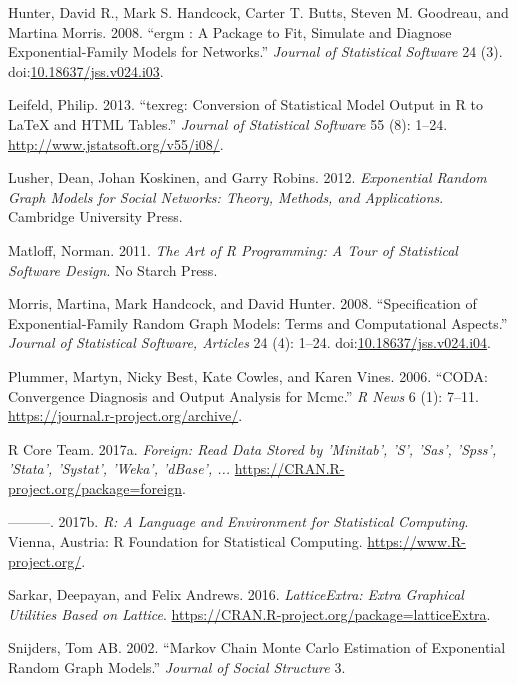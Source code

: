 \documentclass[]{book}
\theoremstyle{definition}
\theoremstyle{definition}
\theoremstyle{definition}
\theoremstyle{remark}
\begin{document}
\hypertarget{ref-Hunter2008}{}
Hunter, David R., Mark S. Handcock, Carter T. Butts, Steven M. Goodreau,
and Martina Morris. 2008. ``ergm : A Package to Fit, Simulate and
Diagnose Exponential-Family Models for Networks.'' \emph{Journal of
Statistical Software} 24 (3).
doi:\href{https://doi.org/10.18637/jss.v024.i03}{10.18637/jss.v024.i03}.

\hypertarget{ref-R-texreg}{}
Leifeld, Philip. 2013. ``texreg: Conversion of Statistical Model Output
in R to LaTeX and HTML Tables.'' \emph{Journal of Statistical Software}
55 (8): 1--24. \url{http://www.jstatsoft.org/v55/i08/}.

\hypertarget{ref-lusher2012}{}
Lusher, Dean, Johan Koskinen, and Garry Robins. 2012. \emph{Exponential
Random Graph Models for Social Networks: Theory, Methods, and
Applications}. Cambridge University Press.

\hypertarget{ref-Matloff2011}{}
Matloff, Norman. 2011. \emph{The Art of R Programming: A Tour of
Statistical Software Design}. No Starch Press.

\hypertarget{ref-Morris2008}{}
Morris, Martina, Mark Handcock, and David Hunter. 2008. ``Specification
of Exponential-Family Random Graph Models: Terms and Computational
Aspects.'' \emph{Journal of Statistical Software, Articles} 24 (4):
1--24.
doi:\href{https://doi.org/10.18637/jss.v024.i04}{10.18637/jss.v024.i04}.

\hypertarget{ref-R-coda}{}
Plummer, Martyn, Nicky Best, Kate Cowles, and Karen Vines. 2006. ``CODA:
Convergence Diagnosis and Output Analysis for Mcmc.'' \emph{R News} 6
(1): 7--11. \url{https://journal.r-project.org/archive/}.

\hypertarget{ref-R-foreign}{}
R Core Team. 2017a. \emph{Foreign: Read Data Stored by 'Minitab', 'S',
'Sas', 'Spss', 'Stata', 'Systat', 'Weka', 'dBase', ...}
\url{https://CRAN.R-project.org/package=foreign}.

\hypertarget{ref-R}{}
---------. 2017b. \emph{R: A Language and Environment for Statistical
Computing}. Vienna, Austria: R Foundation for Statistical Computing.
\url{https://www.R-project.org/}.

\hypertarget{ref-R-latticeExtra}{}
Sarkar, Deepayan, and Felix Andrews. 2016. \emph{LatticeExtra: Extra
Graphical Utilities Based on Lattice}.
\url{https://CRAN.R-project.org/package=latticeExtra}.

\hypertarget{ref-Snijders2002}{}
Snijders, Tom AB. 2002. ``Markov Chain Monte Carlo Estimation of
Exponential Random Graph Models.'' \emph{Journal of Social Structure} 3.
\end{document}
